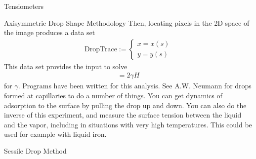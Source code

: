 \documentclass{article}
\newcommand{\matr}[1]{\bm{#1}}
\begin{document}
\begin{section}{Tensiometers}
\begin{subsection}{Axisymmetric Drop Shape Methodology}
	Then, locating pixels in the 2D space of the image produces a data set
	\begin{align*}
		\text{DropTrace}:=\begin{cases}x = x(s)\\y = y(s)\end{cases}
	\end{align*}
	This data set provides the input to solve 
	\begin{align*}
		[\hat{n}\cdot\matr{P}\cdot\hat{n}] = 2\gamma H
	\end{align*} 
	for $\gamma$. Programs have been written for this analysis. See A.W. Neumann
	for drops formed at capillaries to do a number of things. You can get dynamics of adsorption to the surface by pulling the drop up and down. You can also do the inverse of this experiment, and measure the surface tension between the liquid and the vapor, including in situations with very high temperatures. This could be used for example with liquid iron.
\end{subsection}
\begin{subsection}{Sessile Drop Method}


\end{subsection}
\end{section}
\end{document}
